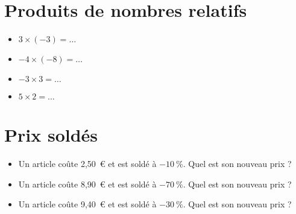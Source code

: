 \documentclass[a4paper,11pt,fleqn]{article}		%
\begin{document}
\section{Produits de nombres relatifs}
\begin{itemize}

  \item $3\times(-3)=\ldots$
  \item $-4\times(-8)=\ldots$
  \item $-3\times3=\ldots$
  \item $5\times2=\ldots$
\end{itemize}


\section{Prix soldés}
\begin{itemize}

  \item Un article coûte 2,50~€ et est soldé à $-10~\%$. Quel est son nouveau prix ?
  \item Un article coûte 8,90~€ et est soldé à $-70~\%$. Quel est son nouveau prix ?
  \item Un article coûte 9,40~€ et est soldé à $-30~\%$. Quel est son nouveau prix ?
\end{itemize}
\end{document}
